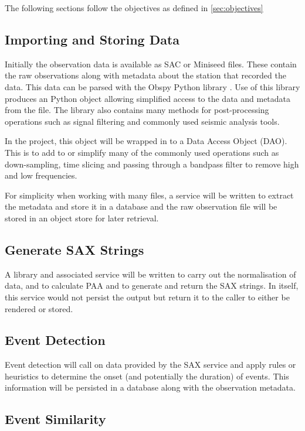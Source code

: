 \documentclass[../report.tex]{subfiles}
\begin{document}
The following sections follow the objectives as defined in \cref{sec:objectives}

\subsection{Importing and Storing Data}

	Initially the observation data is available as SAC or Miniseed files.  These contain the raw observations along with metadata about the station that recorded the data.  This data can be parsed with the Obspy Python library \citep{obspy}.  Use of this library produces an Python object allowing simplified access to the data and metadata from the file.  The library also contains many methods for post-processing operations such as signal filtering and commonly used seismic analysis tools.
	
	In the project, this object will be wrapped in to a Data Access Object (DAO).  This is to add to or simplify many of the commonly used operations such as down-sampling, time slicing and passing through a bandpass filter to remove high and low frequencies.
	
	For simplicity when working with many files, a service will be written to extract the metadata and store it in a database and the raw observation file will be stored in an object store for later retrieval.

\subsection{Generate SAX Strings}

	A library and associated service will be written to carry out the normalisation of data, and to calculate PAA and to generate and return the SAX strings.  In itself, this service would not persist the output but return it to the caller to either be rendered or stored.

\subsection{Event Detection}

	Event detection will call on data provided by the SAX service and apply rules or heuristics to determine the onset (and potentially the duration) of events.  This information will be persisted in a database along with the observation metadata.
	
\subsection{Event Similarity}
\end{document}

